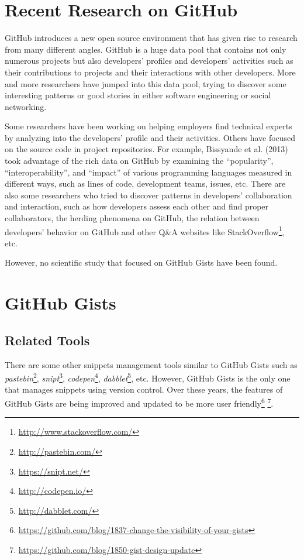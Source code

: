 \section{Recent Research on GitHub}
GitHub introduces a new open source environment that has given rise to research from many different angles. GitHub is a huge data pool that contains not only numerous projects but also developers' profiles and developers' activities such as their contributions to projects and their interactions with other developers. More and more researchers have jumped into this data pool, trying to discover some interesting patterns or good stories in either software engineering or social networking. 

Some researchers have been working on helping employers find technical experts by analyzing into the developers' profile and their activities.\cite{6336698}\cite{Marlow:2013:ATS:2441776.2441794}\cite{Venkataramani:2013:DTE:2487788.2487832}\cite{6671295} Others have focused on the source code in project repositories. For example, Bissyande et al. (2013) took advantage of the rich data on GitHub by examining the ``popularity'', ``interoperability'', and ``impact'' of various programming languages measured in different ways, such as lines of code, development teams, issues, etc.\cite{6649842} There are also some researchers who tried to discover patterns in developers' collaboration and interaction, such as how developers assess each other and find proper collaborators\cite{Majumder:2012:CTF:2339530.2339690}\cite{Marlow:2013:IFO:2441776.2441792}\cite{Singer:2013:MAS:2441776.2441791}, the herding phenomena on GitHub\cite{Choi:2013:HOS:2441955.2441989}, the relation between developers' behavior on GitHub and other Q\&A websites like StackOverflow\footnote{\url{http://www.stackoverflow.com/}}\cite{6693332}, etc.

However, no scientific study that focused on GitHub Gists have been found.

\section{GitHub Gists}

\subsection{Related Tools}
There are some other snippets management tools similar to GitHub Gists such as \textit{pastebin}\footnote{\url{http://pastebin.com/}}, \textit{snipt}\footnote{\url{https://snipt.net/}}, \textit{codepen}\footnote{\url{http://codepen.io/}}, \textit{dabblet}\footnote{\url{http://dabblet.com/}}, etc. However, GitHub Gists is the only one that manages snippets using version control. Over these years, the features of GitHub Gists are being improved and updated to be more user friendly\footnote{\url{https://github.com/blog/1837-change-the-visibility-of-your-gists}} \footnote{\url{https://github.com/blog/1850-gist-design-update}}.

